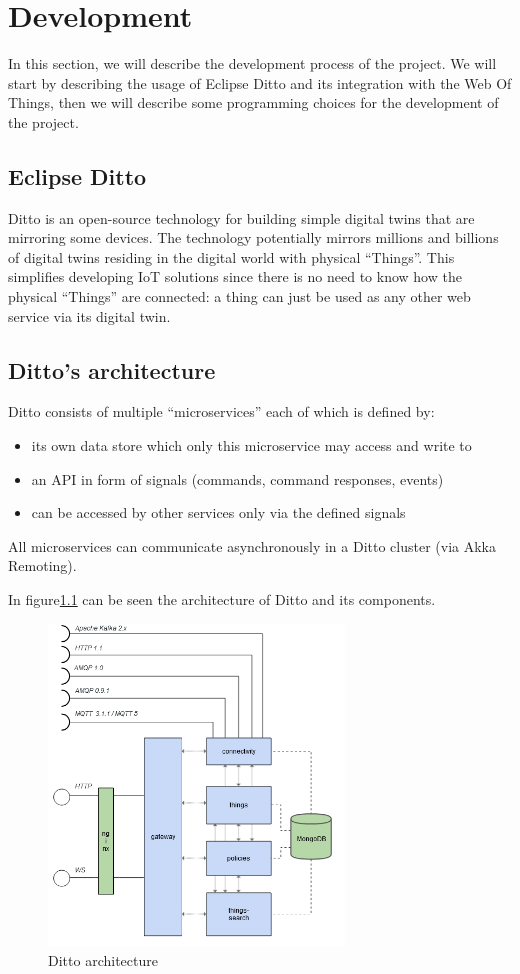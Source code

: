 \chapter{Development}
In this section, we will describe the development process of the project. We will start by describing the usage of Eclipse Ditto and its integration with the Web Of Things, then we will describe some programming choices for the development of the project.

\section{Eclipse Ditto}
Ditto is an open-source technology for building simple digital twins that are mirroring some devices.
The technology potentially mirrors millions and billions of digital twins residing in the digital world with physical ``Things''.
This simplifies developing IoT solutions since there is no need to know how the physical ``Things'' are connected:
a thing can just be used as any other web service via its digital twin.


\section{Ditto's architecture}
Ditto consists of multiple ``microservices'' each of which is defined by:
\begin{itemize}
  \item its own data store which only this microservice may access and write to
  \item an API in form of signals (commands, command responses, events)
  \item can be accessed by other services only via the defined signals
\end{itemize}
All microservices can communicate asynchronously in a Ditto cluster (via Akka Remoting).

In figure\ref{fig:ditto-architecture} can be seen the architecture of Ditto and its components.

\begin{figure}[H]
  \centering
  \includegraphics[width=0.7\textwidth]{img/ditto-architecture.png}
  \caption{Ditto architecture}
  \label{fig:ditto-architecture}
\end{figure}

